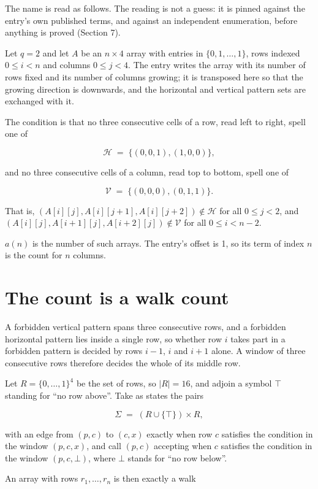 \documentclass[11pt]{article}
\theoremstyle{definition}
\begin{document}
The name is read as follows. The reading is not a guess: it is pinned against the entry's own published terms, and against an independent enumeration, before anything is proved (Section 7).

Let $q = 2$ and let $A$ be an $n \times 4$ array with entries in $\{0,1,\dots,1\}$, rows indexed $0 \le i < n$ and columns $0 \le j < 4$. The entry writes the array with its number of rows fixed and its number of columns growing; it is transposed here so that the growing direction is downwards, and the horizontal and vertical pattern sets are exchanged with it.

The condition is that no three consecutive cells of a row, read left to right, spell one of

\[\mathcal{H} \;=\; \{(0,0,1), (1,0,0)\},\]

and no three consecutive cells of a column, read top to bottom, spell one of

\[\mathcal{V} \;=\; \{(0,0,0), (0,1,1)\}.\]

That is, $(A[i][j],A[i][j{+}1],A[i][j{+}2]) \notin \mathcal{H}$ for all $0 \le j < 2$, and $(A[i][j],A[i{+}1][j],A[i{+}2][j]) \notin \mathcal{V}$ for all $0 \le i < n-2$.

$a(n)$ is the number of such arrays. The entry's offset is 1, so its term of index $n$ is the count for $n$ columns.

\section{The count is a walk count}

A forbidden vertical pattern spans three consecutive rows, and a forbidden horizontal pattern lies inside a single row, so whether row $i$ takes part in a forbidden pattern is decided by rows $i-1$, $i$ and $i+1$ alone. A window of three consecutive rows therefore decides the whole of its middle row.

Let $R = \{0,\dots,1\}^{4}$ be the set of rows, so $|R| = 16$, and adjoin a symbol $\top$ standing for ``no row above''. Take as states the pairs

\[\Sigma \;=\; (R \cup \{\top\}) \times R,\]

with an edge from $(p,c)$ to $(c,x)$ exactly when row $c$ satisfies the condition in the window $(p,c,x)$, and call $(p,c)$ accepting when $c$ satisfies the condition in the window $(p,c,\bot)$, where $\bot$ stands for ``no row below''.

An array with rows $r_1,\dots,r_n$ is then exactly a walk
\end{document}
